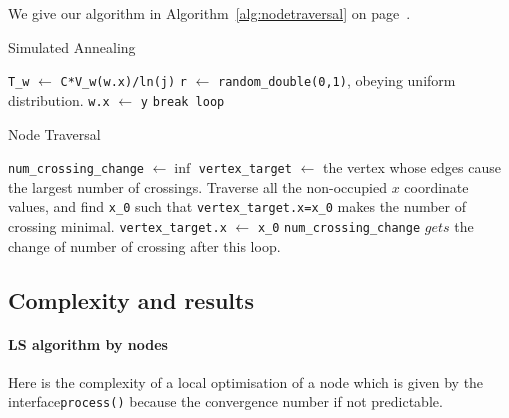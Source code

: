 We give our algorithm in Algorithm~\ref{alg:nodetraversal} on page~\pageref{alg:nodetraversal}.

\begin{algorithm}
    \caption{Simulated Annealing}
    \label{alg:simuanneal}
    \begin{algorithmic}
            \STATE \lstinline{T_w} $\gets$ \lstinline{C*V_w(w.x)/ln(j)}
            \STATE\lstinline{r} $\gets$ \lstinline{random_double(0,1)}, obeying uniform distribution.
                \STATE \lstinline{w.x} $\gets$ \lstinline{y}
            \ENDIF
                \STATE \lstinline{break loop}
            \ENDIF
        \ENDFOR
    \ENDFOR
    \end{algorithmic}
\end{algorithm}

\begin{algorithm}
    \caption{Node Traversal}
    \label{alg:nodetraversal}
    \begin{algorithmic}
    \STATE \lstinline{num_crossing_change} $\gets \inf$ 
        \STATE \lstinline{vertex_target} $\gets$ the vertex whose edges cause the largest number of crossings.
        \STATE Traverse all the non-occupied $x$ coordinate values, and find \lstinline{x_0} such that \lstinline{vertex_target.x=x_0} makes the number of crossing minimal. 
        \STATE \lstinline{vertex_target.x} $\gets$ \lstinline{x_0}
        \STATE \lstinline{num_crossing_change} $gets$ the change of number of crossing after this loop.
    \ENDWHILE
    \end{algorithmic}
\end{algorithm}


\subsection{Complexity and results}

\paragraph{LS algorithm by nodes}
Here is the complexity of a local optimisation of a node which is given by the interface\lstinline{process()} because the convergence number if not predictable.


